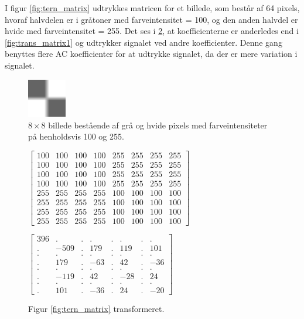 I figur \ref{fig:tern_matrix} udtrykkes matricen for et billede, som består af 64 pixels, hvoraf halvdelen er i gråtoner med farveintensitet = 100, og den anden halvdel er hvide med farveintensitet = 255. Det ses i \ref{fig:trans_matrix2}, at koefficienterne er anderledes end i \ref{fig:trans_matrix1} og udtrykker signalet ved andre koefficienter. Denne gang benyttes flere AC koefficienter for at udtrykke signalet, da der er mere variation i signalet.
\begin{figure}[htbp]
\centering
\includegraphics[width=0.15\textwidth]{Billeder/8x8_eks3.png}
\caption{$8 \times 8$ billede bestående af grå og hvide pixels med farveintensiteter på henholdsvis 100 og 255.}
\label{fig:8x8halvgraa}
\end{figure}
\begin{figure}[htbp]
\begin{minipage}[b]{0.45\linewidth}
\centering
$\begin{bmatrix}
100	&	100	&	100	&	100	&	255	&	255	&	255	&	255\\
100	&	100	&	100	&	100	&	255	&	255	&	255	&	255\\
100	&	100	&	100	&	100	&	255	&	255	&	255	&	255\\
100	&	100	&	100	&	100	&	255	&	255	&	255	&	255\\
255	&	255	&	255	&	255	&	100	&	100	&	100	&	100\\
255	&	255 &	255	&	255	&	100	&	100	&	100	&	100\\
255	&	255	&	255	&	255	&	100	&	100	&	100	&	100\\
255	&	255	&	255	&	255	&	100	&	100	&	100	&	100
\end{bmatrix}$
\caption{Pixelværdier for figur \ref{fig:8x8halvgraa}.\label{fig:tern_matrix}}
\end{minipage}
\hspace{1.0cm}
\begin{minipage}[b]{0.45\linewidth}
\centering
$\begin{bmatrix}
396	&	.		&	.	&	.	&	.	&	.	&	.	&	.	\\
.	&	-509		&	.	&	179	&	.	&	119	&	.	&	101	\\
.	&	.		&	.	&	.	&	.	&	.	&	.	&	.	\\
.	&	179		&	.	&	-63	&	.	&	42	&	.	&	-36	\\
.	&	.		&	.	&	.	&	.	&	.	&	.	&	.	\\
.	&	-119		&	.	&	42	&	.	&	-28	&	.	&	24	\\
.	&	.		&	.	&	.	&	.	&	.	&	.	&	.	\\
.	&	101		&	.	&	-36	&	.	&	24	&	.	&	-20
\end{bmatrix}
$
\caption{Figur \ref{fig:tern_matrix} transformeret.\label{fig:trans_matrix2}}
\end{minipage}
\end{figure}
